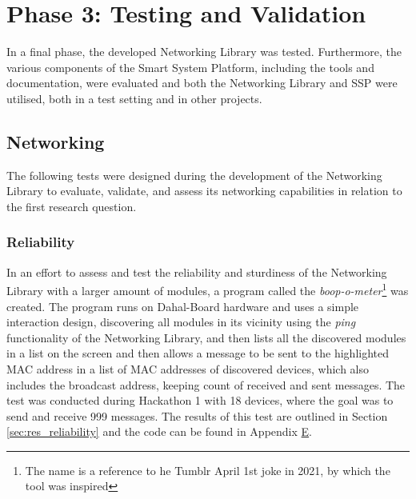 \section{\label{sec:methods_ph3}Phase 3: Testing and Validation}
In a final phase, the developed Networking Library was tested. Furthermore, the various components of the Smart System Platform, including the tools and documentation, were evaluated and both the Networking Library and SSP were utilised, both in a test setting and in other projects.

\subsection{\label{sec:methods_test_net}Networking}
The following tests were designed during the development of the Networking Library to evaluate, validate, and assess its networking capabilities in relation to the first research question.

\subsubsection{\label{sec:methods_test_boop}Reliability}
In an effort to assess and test the reliability and sturdiness of the Networking Library with a larger amount of modules, a program called the \textit{boop-o-meter}\footnote{The name is a reference to he Tumblr April 1st joke in 2021, by which the tool was inspired} was created. The program runs on Dahal-Board hardware and uses a simple interaction design, discovering all modules in its vicinity using the \textit{ping} functionality of the Networking Library, and then lists all the discovered modules in a list on the screen and then allows a message to be sent to the highlighted MAC address in a list of MAC addresses of discovered devices, which also includes the broadcast address, keeping count of received and sent messages. The test was conducted during Hackathon 1 with 18 devices, where the goal was to send and receive 999 messages.
The results of this test are outlined in Section \ref{sec:res_reliability} and the code can be found in Appendix \hyperref[chap:apx_e]{E}.

